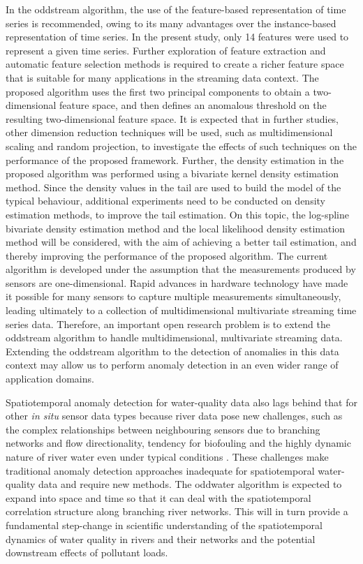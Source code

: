 \documentclass{monashthesis}
\theoremstyle{definition}
\theoremstyle{definition}
\theoremstyle{definition}
\theoremstyle{remark}
\begin{document}
In the oddstream algorithm, the use of the feature-based representation of time series is recommended, owing to its many advantages over the instance-based representation of time series. In the present study, only 14 features were used to represent a given time series. Further exploration of feature extraction and automatic feature selection methods is required to create a richer feature space that is suitable for many applications in the streaming data context. The proposed algorithm uses the first two principal components to obtain a two-dimensional feature space, and then defines an anomalous threshold on the resulting two-dimensional feature space. It is expected that in further studies, other dimension reduction techniques will be used, such as multidimensional scaling and random projection, to investigate the effects of such techniques on the performance of the proposed framework. Further, the density estimation in the proposed algorithm was performed using a bivariate kernel density estimation
method. Since the density values in the tail are used to build the model of the typical behaviour, additional experiments need to be conducted on density estimation methods, to improve the tail estimation. On this topic, the log-spline bivariate density estimation method and the local likelihood density estimation method will be considered, with the aim of achieving a better tail estimation, and thereby improving the performance of the proposed algorithm.
The current algorithm is developed under the assumption that the measurements produced by sensors are one-dimensional. Rapid advances in hardware technology have made it possible for many sensors to capture multiple measurements simultaneously, leading ultimately to a collection of multidimensional multivariate streaming time series data. Therefore, an important open research problem is to extend the oddstream algorithm to handle multidimensional, multivariate streaming data. Extending the oddstream algorithm to the detection of anomalies in this data context may allow us to perform anomaly detection in an even wider range of application domains.

Spatiotemporal anomaly detection for water-quality data also lags behind that for other \emph{in situ} sensor data types \autocite[e.g., air quality or meteorology;][]{wu2008spatio} because river data pose new challenges, such as the complex relationships between neighbouring sensors due to branching networks and flow directionality, tendency for biofouling and the highly dynamic nature of river water even under typical conditions \autocite{kang2009discovering}. These challenges make traditional anomaly detection approaches inadequate for spatiotemporal water-quality data and require new methods. The oddwater algorithm is expected to expand into space and time so that it can deal with the spatiotemporal correlation structure along branching river networks. This will in turn provide a fundamental step-change in scientific understanding of the spatiotemporal dynamics of water quality in rivers and their networks and the potential downstream effects of pollutant loads.
\end{document}
